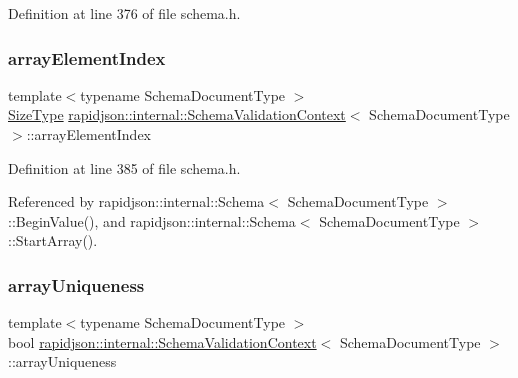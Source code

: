 Definition at line 376 of file schema.\+h.

\mbox{\label{structrapidjson_1_1internal_1_1_schema_validation_context_a4a3c34e71ec6acd43b56eb596cd137f0}} 
\subsubsection{\texorpdfstring{arrayElementIndex}{arrayElementIndex}}
{\footnotesize\ttfamily template$<$typename Schema\+Document\+Type $>$ \\
\mbox{\hyperlink{namespacerapidjson_a44eb33eaa523e36d466b1ced64b85c84}{Size\+Type}} \mbox{\hyperlink{structrapidjson_1_1internal_1_1_schema_validation_context}{rapidjson\+::internal\+::\+Schema\+Validation\+Context}}$<$ Schema\+Document\+Type $>$\+::array\+Element\+Index}



Definition at line 385 of file schema.\+h.



Referenced by rapidjson\+::internal\+::\+Schema$<$ Schema\+Document\+Type $>$\+::\+Begin\+Value(), and rapidjson\+::internal\+::\+Schema$<$ Schema\+Document\+Type $>$\+::\+Start\+Array().

\mbox{\label{structrapidjson_1_1internal_1_1_schema_validation_context_a3b892aef49ef30846a2fb97abb1d0a6c}} 
\subsubsection{\texorpdfstring{arrayUniqueness}{arrayUniqueness}}
{\footnotesize\ttfamily template$<$typename Schema\+Document\+Type $>$ \\
bool \mbox{\hyperlink{structrapidjson_1_1internal_1_1_schema_validation_context}{rapidjson\+::internal\+::\+Schema\+Validation\+Context}}$<$ Schema\+Document\+Type $>$\+::array\+Uniqueness}



